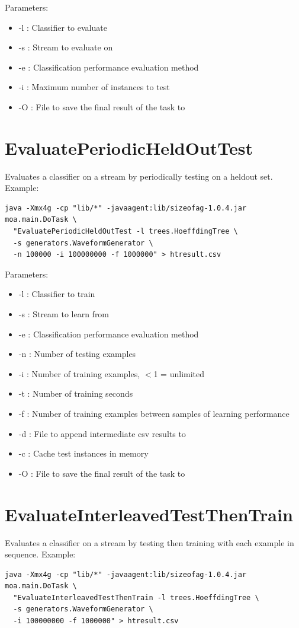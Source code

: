 \documentclass[a4paper,12pt,twoside]{book}
\begin{document}
Parameters:
\begin{itemize}
\item -l : Classifier to evaluate
\item -s : Stream to evaluate on
\item -e : Classification performance evaluation method
\item -i : Maximum number of instances to test
\item -O : File to save the final result of the task to
\end{itemize}

\section{EvaluatePeriodicHeldOutTest}

Evaluates a classifier on a stream by periodically testing on a heldout set.
Example:
\begin{footnotesize}\begin{verbatim}
java -Xmx4g -cp "lib/*" -javaagent:lib/sizeofag-1.0.4.jar moa.main.DoTask \
  "EvaluatePeriodicHeldOutTest -l trees.HoeffdingTree \
  -s generators.WaveformGenerator \
  -n 100000 -i 100000000 -f 1000000" > htresult.csv
\end{verbatim}\end{footnotesize}

Parameters:
\begin{itemize}
\item -l : Classifier to train
\item -s : Stream to learn from
\item -e : Classification performance evaluation method
\item -n : Number of testing examples
\item -i : Number of training examples, $<$1 = unlimited
\item -t : Number of training seconds
\item -f : Number of training examples between samples of learning performance
\item -d : File to append intermediate csv results to
\item -c : Cache test instances in memory
\item -O : File to save the final result of the task to
\end{itemize}

\section{EvaluateInterleavedTestThenTrain}
Evaluates a classifier on a stream by testing then training with each example in sequence.
Example:
\begin{footnotesize}\begin{verbatim}
java -Xmx4g -cp "lib/*" -javaagent:lib/sizeofag-1.0.4.jar moa.main.DoTask \
  "EvaluateInterleavedTestThenTrain -l trees.HoeffdingTree \
  -s generators.WaveformGenerator \
  -i 100000000 -f 1000000" > htresult.csv
\end{verbatim}
\end{footnotesize}
\end{document}
